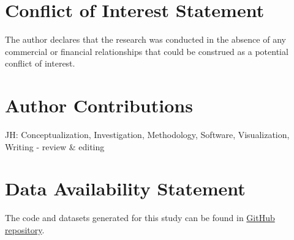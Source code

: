 \documentclass[utf8]{FrontiersinHarvard} %
\begin{document}
\section*{Conflict of Interest Statement}

The author declares that the research was conducted in the absence of any commercial or financial relationships that could be construed as a potential conflict of interest.

\section*{Author Contributions}
JH: Conceptualization, Investigation, Methodology, Software, Visualization, Writing - review \& editing



\section*{Data Availability Statement}
The code and datasets generated for this study can be found in \href{https://github.com/JamesHumble/Humble-resource-based-STDP}{GitHub repository}.


\end{document}
